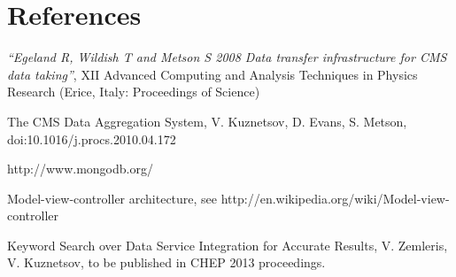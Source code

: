 \section*{References}

\begin{thebibliography}{1}
    {\it ``Egeland R, Wildish T and Metson S 2008 Data transfer infrastructure for CMS data taking''},  XII Advanced Computing and Analysis Techniques in Physics Research (Erice, Italy: Proceedings of Science)

 The CMS Data Aggregation System,
V. Kuznetsov, D. Evans, S. Metson, doi:10.1016/j.procs.2010.04.172

http://www.mongodb.org/

 Model-view-controller architecture, see
http://en.wikipedia.org/wiki/Model-view-controller

 Keyword Search over Data Service Integration for Accurate
Results, V. Zemleris, V. Kuznetsov, to be published in CHEP 2013 proceedings.

\end{thebibliography}
